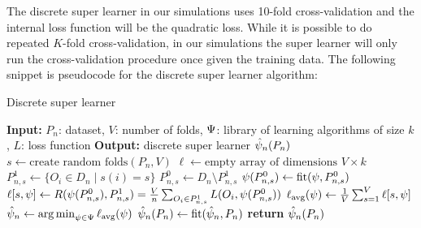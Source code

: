\documentclass[./main.tex]{subfiles}
\begin{document}
The discrete super learner in our simulations uses 10-fold cross-validation and the internal loss function will be the quadratic loss. While it is possible to do repeated $ K $-fold cross-validation, in our simulations the super learner will only run the cross-validation procedure once given the training data. The following snippet is pseudocode for the discrete super learner algorithm:
\begin{algorithm}[H]
\caption{Discrete super learner}
\begin{algorithmic}[1]
\State \textbf{Input:} $P_n$: dataset, $V$: number of folds, $ \Psi $: library of learning algorithms of size $ k $, $ L $: loss function
\State \textbf{Output:} discrete super learner $ \hat{\psi}_n(P_n) $
\State $s \gets \text{create random folds}(P_n, V)$ 
\State $\ell \gets \text{empty array of dimensions } V \times k$  
    \State $P_{n, s}^{1} \gets \{O_i \in D_n \mid s(i) = s\} $
    \State $P_{n, s}^{0} \gets D_n \setminus P_{n,s}^{1} $
    \For{$\la \in \lib$}
    \State $ \psi(P_{n,s}^{0}) \gets \text{fit}(\psi, P_{n, s}^{0})$
    \State $\ell[s,\psi] \gets R(\psi(P_{n, s}^{0}), P_{n,s}^{1}) = \frac{V}{n} \sum_{O_i \in P_{n,s}^{1}} L(O_i, \psi(P_{n, s}^{0})) $
    \EndFor
\EndFor
\For{$\la \in \lib$}
    \State $ \ell_{\text{avg}}(\psi) \gets \frac{1}{V} \sum_{s = 1}^{V} \ell[s,\psi] $ 
\EndFor
\State $ \hat{\psi}_n \gets \operatorname*{arg\,min}_{\psi \in \Psi} \ell_{\text{avg}}(\psi) $
\State $ \hat{\psi}_n(P_n) \gets \text{fit}(\hat{\psi}_n, P_n) $  
\State \textbf{return} $ \hat{\psi}_n(P_n) $
\end{algorithmic}
\end{algorithm}
\end{document}
